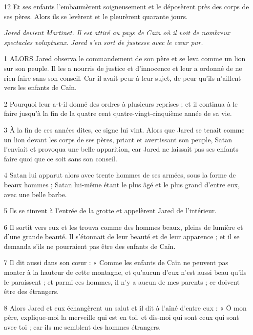 \par 12 Et ses enfants l'embaumèrent soigneusement et le déposèrent près des corps de ses pères. Alors ils se levèrent et le pleurèrent quarante jours.


\par \textit{Jared devient Martinet. Il est attiré au pays de Caïn où il voit de nombreux spectacles voluptueux. Jared s'en sort de justesse avec le cœur pur.}

\par 1 ALORS Jared observa le commandement de son père et se leva comme un lion sur son peuple. Il les a nourris de justice et d’innocence et leur a ordonné de ne rien faire sans son conseil. Car il avait peur à leur sujet, de peur qu'ils n'aillent vers les enfants de Caïn.

\par 2 Pourquoi leur a-t-il donné des ordres à plusieurs reprises ; et il continua à le faire jusqu'à la fin de la quatre cent quatre-vingt-cinquième année de sa vie.

\par 3 À la fin de ces années dites, ce signe lui vint. Alors que Jared se tenait comme un lion devant les corps de ses pères, priant et avertissant son peuple, Satan l'enviait et provoqua une belle apparition, car Jared ne laissait pas ses enfants faire quoi que ce soit sans son conseil.

\par 4 Satan lui apparut alors avec trente hommes de ses armées, sous la forme de beaux hommes ; Satan lui-même étant le plus âgé et le plus grand d'entre eux, avec une belle barbe.

\par 5 Ils se tinrent à l'entrée de la grotte et appelèrent Jared de l'intérieur.

\par 6 Il sortit vers eux et les trouva comme des hommes beaux, pleins de lumière et d'une grande beauté. Il s'étonnait de leur beauté et de leur apparence ; et il se demanda s'ils ne pourraient pas être des enfants de Caïn.

\par 7 Il dit aussi dans son cœur : « Comme les enfants de Caïn ne peuvent pas monter à la hauteur de cette montagne, et qu'aucun d'eux n'est aussi beau qu'ils le paraissent ; et parmi ces hommes, il n’y a aucun de mes parents ; ce doivent être des étrangers.

\par 8 Alors Jared et eux échangèrent un salut et il dit à l'aîné d'entre eux : « Ô mon père, explique-moi la merveille qui est en toi, et dis-moi qui sont ceux qui sont avec toi ; car ils me semblent des hommes étrangers.

